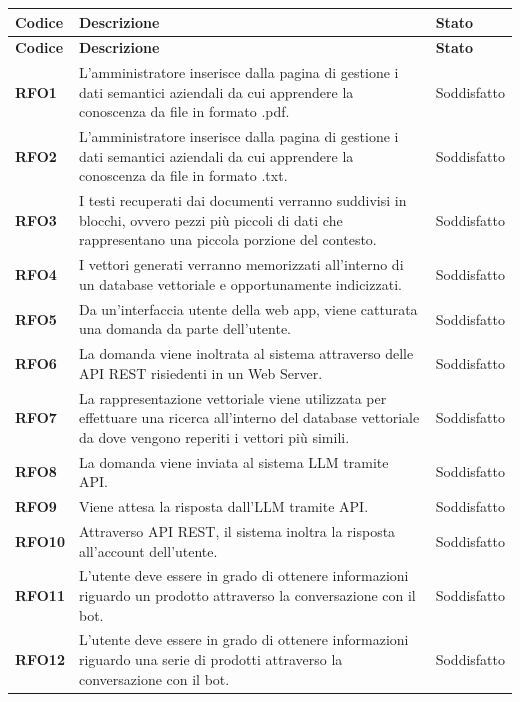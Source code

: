 \begin{longtable}{|>{\centering\arraybackslash}m{}|>{\centering\arraybackslash}m{}|>{\centering\arraybackslash}m{}|}
	\hline
	\textbf{Codice} & \textbf{Descrizione} & \textbf{Stato}\\\hline
	\endfirsthead
	\hline
	\textbf{Codice} & \textbf{Descrizione} & \textbf{Stato}\\\hline
	\endhead
	\hline
    \textbf{RFO1} & L'amministratore inserisce dalla pagina di gestione i dati semantici aziendali da cui apprendere la conoscenza da file in formato .pdf. & Soddisfatto \\
    \hline
    \textbf{RFO2} & L'amministratore inserisce dalla pagina di gestione i dati semantici aziendali da cui apprendere la conoscenza da file in formato .txt. & Soddisfatto \\
    \hline
    \textbf{RFO3} & I testi recuperati dai documenti verranno suddivisi in blocchi, ovvero pezzi più piccoli di dati che rappresentano una piccola porzione del contesto. & Soddisfatto \\
    \hline
    \textbf{RFO4} & I vettori generati verranno memorizzati all’interno di un database vettoriale e opportunamente indicizzati. & Soddisfatto \\
    \hline
    \textbf{RFO5} & Da un’interfaccia utente della web app, viene catturata una domanda da parte dell’utente. & Soddisfatto \\
    \hline
    \textbf{RFO6} & La domanda viene inoltrata al sistema attraverso delle API REST risiedenti in un Web Server. & Soddisfatto \\
    \hline
    \textbf{RFO7} & La rappresentazione vettoriale viene utilizzata per effettuare una ricerca all’interno del database vettoriale da dove vengono reperiti i vettori più simili. & Soddisfatto \\
    \hline
    \textbf{RFO8} & La domanda viene inviata al sistema LLM tramite API. & Soddisfatto \\
    \hline
    \textbf{RFO9} & Viene attesa la risposta dall'LLM tramite API. & Soddisfatto \\
    \hline
    \textbf{RFO10} & Attraverso API REST, il sistema inoltra la risposta all'account dell’utente. & Soddisfatto \\
    \hline
    \textbf{RFO11} & L'utente deve essere in grado di ottenere informazioni riguardo un prodotto attraverso la conversazione con il bot. & Soddisfatto \\
    \hline
    \textbf{RFO12} & L'utente deve essere in grado di ottenere informazioni riguardo una serie di prodotti attraverso la conversazione con il bot. & Soddisfatto \\

\end{longtable}
